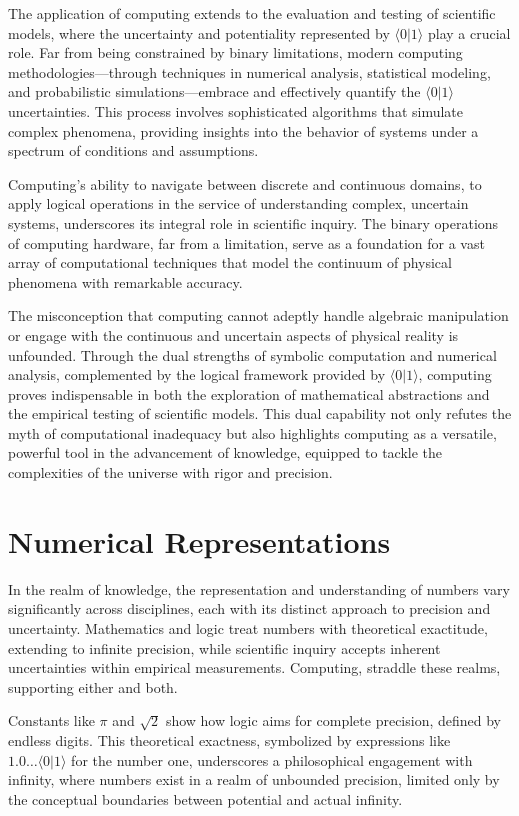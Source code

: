 \documentclass[12pt]{article}
\newcommand{\qbit}{\langle 0 | 1 \rangle}
\begin{document}
The application of computing extends to the evaluation and testing of scientific models, where the uncertainty and potentiality represented by \(\qbit\) play a crucial role. Far from being constrained by binary limitations, modern computing methodologies—through techniques in numerical analysis, statistical modeling, and probabilistic simulations—embrace and effectively quantify the \(\qbit\) uncertainties. This process involves sophisticated algorithms that simulate complex phenomena, providing insights into the behavior of systems under a spectrum of conditions and assumptions.

Computing's ability to navigate between discrete and continuous domains, to apply logical operations in the service of understanding complex, uncertain systems, underscores its integral role in scientific inquiry. The binary operations of computing hardware, far from a limitation, serve as a foundation for a vast array of computational techniques that model the continuum of physical phenomena with remarkable accuracy.

The misconception that computing cannot adeptly handle algebraic manipulation or engage with the continuous and uncertain aspects of physical reality is unfounded. Through the dual strengths of symbolic computation and numerical analysis, complemented by the logical framework provided by \(\qbit\), computing proves indispensable in both the exploration of mathematical abstractions and the empirical testing of scientific models. This dual capability not only refutes the myth of computational inadequacy but also highlights computing as a versatile, powerful tool in the advancement of knowledge, equipped to tackle the complexities of the universe with rigor and precision.

\section*{Numerical Representations}

In the realm of knowledge, the representation and understanding of numbers vary significantly across disciplines, each with its distinct approach to precision and uncertainty. Mathematics and logic treat numbers with theoretical exactitude, extending to infinite precision, while scientific inquiry accepts inherent uncertainties within empirical measurements. Computing, straddle these realms, supporting either and both.

Constants like \(\pi\) and \(\sqrt{2}\) show how logic aims for complete precision, defined by endless digits. This theoretical exactness, symbolized by expressions like \(1.0\ldots\qbit\) for the number one, underscores a philosophical engagement with infinity, where numbers exist in a realm of unbounded precision, limited only by the conceptual boundaries between potential and actual infinity.
\end{document}
